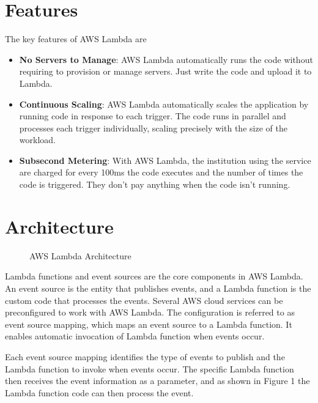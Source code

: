 \documentclass[9pt,twocolumn,twoside]{../../styles/osajnl}
\begin{document}
\section{Features}

The key features of AWS Lambda are \cite{www-AWSLambda}
\begin{itemize}
\renewcommand{\labelitemi}{\scriptsize$\bullet$} 
\item \textbf{No Servers to Manage}: AWS Lambda automatically runs the code 
without requiring to provision or manage servers. Just write the code and 
upload it to Lambda.

\item \textbf{Continuous Scaling}: AWS Lambda automatically scales the 
application by running code in response to each trigger. The code runs in 
parallel and processes each trigger individually, scaling precisely with the 
size of the workload.

\item \textbf{Subsecond Metering}: With AWS Lambda, the institution using the 
service are charged for every 100ms the code executes and the number of times 
the code is triggered. They don't pay anything when the code isn't running.

\end{itemize}

\section{Architecture}

\begin{figure}[h]
\centering
\graphicspath{ {images/} }
\caption{AWS Lambda Architecture} \cite{www-AWSLambda}
\label{fig:false-color}
\end{figure}

Lambda functions and event sources are the core components in AWS Lambda. An 
event source is the entity that publishes events, and a Lambda function is the 
custom code that processes the events. Several AWS cloud services can be 
preconfigured to work with AWS Lambda. The configuration is referred to as 
event source mapping, which maps an event source to a Lambda function. It 
enables automatic invocation of Lambda function when events occur.

Each event source mapping identifies the type of events to publish and the 
Lambda function to invoke when events occur. The specific Lambda function then 
receives the event information as a parameter, and as shown in Figure 1 the 
Lambda function code can then process the event.
\end{document}
